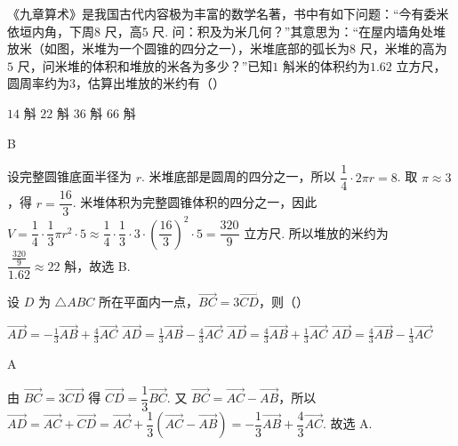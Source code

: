 \begin{problem}
《九章算术》是我国古代内容极为丰富的数学名著，书中有如下问题：“今有委米依垣内角，下周\(8\text{~尺}\)，高\(5\text{~尺}\). 问：积及为米几何？”其意思为：“在屋内墙角处堆放米（如图，米堆为一个圆锥的四分之一），米堆底部的弧长为\(8\text{~尺}\)，米堆的高为\(5\text{~尺}\)，问米堆的体积和堆放的米各为多少？”已知\(1\text{~斛}\)米的体积约为\(1.62\text{~立方尺}\)，圆周率约为\(3\)，估算出堆放的米约有（\quad）


\choices
    {\(14\text{~斛}\)}
    {\(22\text{~斛}\)}
    {\(36\text{~斛}\)}
    {\(66\text{~斛}\)}
\end{problem}

\begin{answer}
B
\end{answer}

\begin{solution}
设完整圆锥底面半径为 \(r\). 米堆底部是圆周的四分之一，所以
\(\dfrac14\cdot2\pi r=8\). 取 \(\pi\approx3\)，得 \(r=\dfrac{16}{3}\). 米堆体积为完整圆锥体积的四分之一，因此
\(V=\dfrac14\cdot\dfrac13\pi r^2\cdot5\approx\dfrac14\cdot\dfrac13\cdot3\cdot\left(\dfrac{16}{3}\right)^2\cdot5=\dfrac{320}{9}\text{~立方尺}\).
所以堆放的米约为 \(\dfrac{\frac{320}{9}}{1.62}\approx22\text{~斛}\)，故选 B.
\end{solution}

\begin{problem}
设 \(D\) 为 \(\triangle ABC\) 所在平面内一点，\(\overrightarrow{BC} = 3\overrightarrow{CD}\)，则（\quad）

\choices
    {\(\overrightarrow{AD} = -\frac{1}{3}\overrightarrow{AB} +\frac{4}{3}\overrightarrow{AC}\)}
    {\(\overrightarrow{AD} = \frac{1}{3}\overrightarrow{AB} -\frac{4}{3}\overrightarrow{AC}\)}
    {\(\overrightarrow{AD} = \frac{4}{3}\overrightarrow{AB} +\frac{1}{3}\overrightarrow{AC}\)}
    {\(\overrightarrow{AD} = \frac{4}{3}\overrightarrow{AB} -\frac{1}{3}\overrightarrow{AC}\)}
\end{problem}

\begin{answer}
A
\end{answer}

\begin{solution}
由 \(\overrightarrow{BC}=3\overrightarrow{CD}\) 得 \(\overrightarrow{CD}=\dfrac13\overrightarrow{BC}\). 又
\(\overrightarrow{BC}=\overrightarrow{AC}-\overrightarrow{AB}\)，所以
\(\overrightarrow{AD}=\overrightarrow{AC}+\overrightarrow{CD}=\overrightarrow{AC}+\dfrac13(\overrightarrow{AC}-\overrightarrow{AB})=-\dfrac13\overrightarrow{AB}+\dfrac43\overrightarrow{AC}\). 故选 A.
\end{solution}

